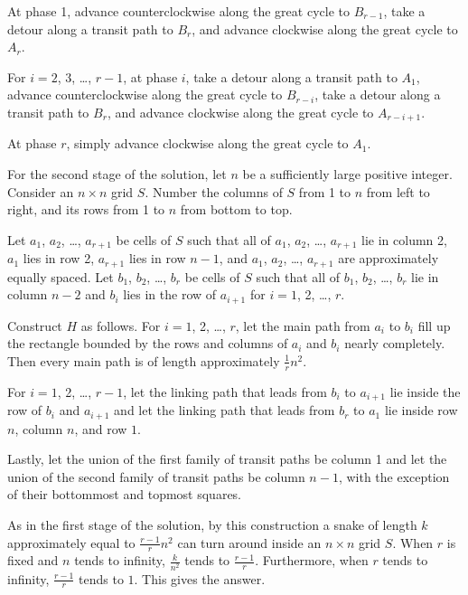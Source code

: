 At phase 1, advance counterclockwise along the great cycle to $B_{r - 1}$, take a detour along a transit path to $B_r$, and advance clockwise along the great cycle to $A_r$.

For $i = 2$, 3, \dots, $r - 1$, at phase $i$, take a detour along a transit path to $A_1$, advance counterclockwise along the great cycle to $B_{r - i}$, take a detour along a transit path to $B_r$, and advance clockwise along the great cycle to $A_{r - i + 1}$.

At phase $r$, simply advance clockwise along the great cycle to $A_1$.

For the second stage of the solution, let $n$ be a sufficiently large positive integer. Consider an $n \times n$ grid $S$. Number the columns of $S$ from 1 to $n$ from left to right, and its rows from 1 to $n$ from bottom to top.

Let $a_1$, $a_2$, \dots, $a_{r + 1}$ be cells of $S$ such that all of $a_1$, $a_2$, \dots, $a_{r + 1}$ lie in column 2, $a_1$ lies in row 2, $a_{r + 1}$ lies in row $n - 1$, and $a_1$, $a_2$, \dots, $a_{r + 1}$ are approximately equally spaced. Let $b_1$, $b_2$, \dots, $b_r$ be cells of $S$ such that all of $b_1$, $b_2$, \dots, $b_r$ lie in column $n - 2$ and $b_i$ lies in the row of $a_{i + 1}$ for $i = 1$, 2, \dots, $r$.

Construct $H$ as follows. For $i = 1$, 2, \dots, $r$, let the main path from $a_i$ to $b_i$ fill up the rectangle bounded by the rows and columns of $a_i$ and $b_i$ nearly completely. Then every main path is of length approximately $\frac{1}{r}n^2$.

For $i = 1$, 2, \dots, $r - 1$, let the linking path that leads from $b_i$ to $a_{i + 1}$ lie inside the row of $b_i$ and $a_{i + 1}$ and let the linking path that leads from $b_r$ to $a_1$ lie inside row $n$, column $n$, and row $1$.

Lastly, let the union of the first family of transit paths be column 1 and let the union of the second family of transit paths be column $n - 1$, with the exception of their bottommost and topmost squares.

As in the first stage of the solution, by this construction a snake of length $k$ approximately equal to $\frac{r - 1}{r}n^2$ can turn around inside an $n \times n$ grid $S$. When $r$ is fixed and $n$ tends to infinity, $\frac{k}{n^2}$ tends to $\frac{r - 1}{r}$. Furthermore, when $r$ tends to infinity, $\frac{r - 1}{r}$ tends to $1$. This gives the answer.
